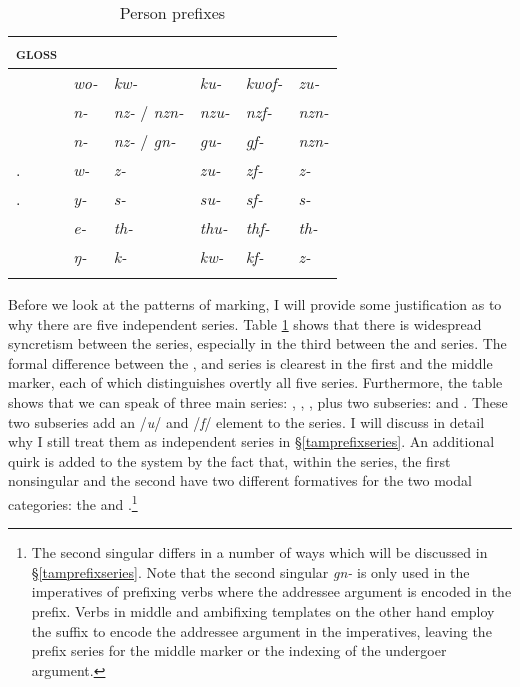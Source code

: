 \begin{table}
\caption{Person prefixes}
\label{perspref}
	\begin{tabular}{llllll}
		\lsptoprule
		\textsc{gloss} &\Alph &\Bet &\Betaone &\Betatwo &\Gam\\\hline
		\Fsg &\emph{wo-} &\emph{kw-} &\emph{ku-} &\emph{kwof-} &\emph{zu-}\\
		\Fnsg &\emph{n-} &\emph{nz-} / \emph{nzn-} &\emph{nzu-} &\emph{nzf-} &\emph{nzn-}\\
		\Ssg &\emph{n-}	&\emph{nz-} / \emph{gn-} &\emph{gu-} &\emph{gf-} &\emph{nzn-}\\
		\Tsg.\F &\emph{w-} &\emph{z-} &\emph{zu-} &\emph{zf-} &\emph{z-}\\
		\Tsg.\Masc &\emph{y-} &\emph{s-} &\emph{su-} &\emph{sf-} &\emph{s-}\\
		\Stnsg &\emph{e-} &\emph{th-} &\emph{thu-} &\emph{thf-} &\emph{th-}\\
		\M &\emph{ŋ-} &\emph{k-} &\emph{kw-} &\emph{kf-} &\emph{z-}\\
		\lspbottomrule
	\end{tabular}
\end{table}%

Before we look at the patterns of  marking, I will provide some justification as to why there are five independent series. Table \ref{perspref} shows that there is widespread syncretism between the series, especially in the third  between the \Bet{} and \Gam{} series. The formal difference between the \Alph, \Bet{} and \Gam{} series is clearest in the first   and the middle marker, each of which distinguishes overtly all five series. Furthermore, the table shows that we can speak of three main series: \Alph, \Bet, \Gam{}, plus two subseries: \Betaone{} and \Betatwo. These two subseries add an /\emph{u}/ and /\emph{f}/ element to the \Bet{} series. I will discuss in detail why I still treat them as independent series in \S{}\ref{tamprefixseries}. An additional quirk is added to the system by the fact that, within the \Bet{} series, the first nonsingular and the second  have two different formatives for the two modal categories: the  and .\footnote{The second singular differs in a number of ways which will be discussed in \S{}\ref{tamprefixseries}. Note that the second singular \emph{gn-} is only used in the imperatives of prefixing verbs where the addressee argument is encoded in the prefix. Verbs in middle and ambifixing templates on the other hand employ the suffix to encode the addressee argument in the imperatives, leaving the prefix \Bet{} series for the middle marker or the indexing of the undergoer argument.}\\

